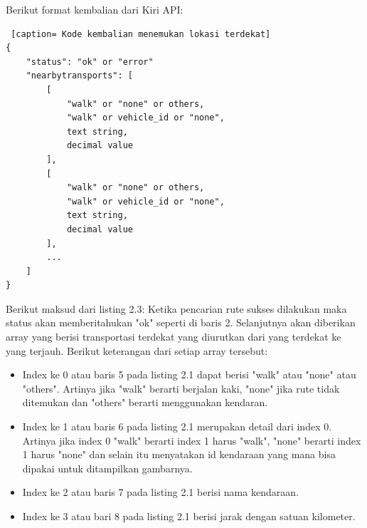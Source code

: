 \vspace{5mm}
Berikut format kembalian dari Kiri API:

\begin{lstlisting} [caption= Kode kembalian menemukan lokasi terdekat]
{
    "status": "ok" or "error"
    "nearbytransports": [
        [
            "walk" or "none" or others,
            "walk" or vehicle_id or "none",
            text string,
            decimal value
        ],
        [
            "walk" or "none" or others,
            "walk" or vehicle_id or "none",
            text string,
            decimal value
        ],
        ...     
    ]
}\end{lstlisting}
Berikut maksud dari listing 2.3:
\hspace{0.5cm} Ketika pencarian rute sukses dilakukan maka status akan memberitahukan "ok" seperti di baris 2. Selanjutnya akan diberikan array yang berisi transportasi terdekat yang diurutkan dari yang terdekat ke yang terjauh. Berikut keterangan dari setiap array tersebut: 
\begin{itemize}
	\item Index ke 0 atau baris 5 pada listing 2.1 dapat berisi "walk" atau "none" atau "others". Artinya  jika "walk" berarti berjalan kaki, "none" jika rute tidak ditemukan dan "others" berarti menggunakan kendaran.
	\item Index ke 1 atau baris 6 pada listing 2.1 merupakan detail dari index 0. Artinya jika index 0 "walk" berarti index 1 harus "walk", "none" berarti index 1 harus "none" dan selain itu menyatakan id kendaraan yang mana bisa dipakai untuk ditampilkan gambarnya.
	\item Index ke 2 atau baris 7 pada listing 2.1 berisi nama kendaraan.
	\item Index ke 3 atau bari 8 pada listing 2.1 berisi jarak dengan satuan kilometer.
\end{itemize}